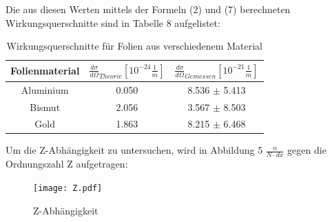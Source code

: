  Die aus diesen Werten mittels der Formeln (2) und (7) berechneten Wirkungsquerschnitte sind in Tabelle 8 aufgelistet:
 
 \begin{table}[H] 
 	\centering
 	\begin{tabular}{c|c c }
 		
 		Folienmaterial & $\frac{d\sigma}{d\Omega}_{Theorie}[ 10^{-24} \frac{1}{m}]$& $\frac{d\sigma}{d\Omega}_{Gemessen}[ 10^{-21} \frac{1}{m}]$ \\ 
 		\hline 
 		
 		Aluminium & 0.050 & 8.536 $\pm$ 5.413 \\ 
 		
 		Bismut & 2.056 & 3.567 $\pm$ 8.503   \\
 		
 		Gold & 1.863 & 8.215 $\pm$ 6.468 \\ 
 		
 	\end{tabular} 
 	\caption{Wirkungsquerschnitte für Folien aus verschiedenem Material} 
 \end{table}
Um die Z-Abhängigkeit zu untersuchen, wird in Abbildung 5 $\frac{n}{N\cdot dx}$ gegen die Ordnungszahl Z aufgetragen: 
\begin{figure}[H]
	\centering
	\texttt{[image: Z.pdf]}
	\caption{Z-Abhängigkeit}
	\label{img:grafik-dummy}
\end{figure}
